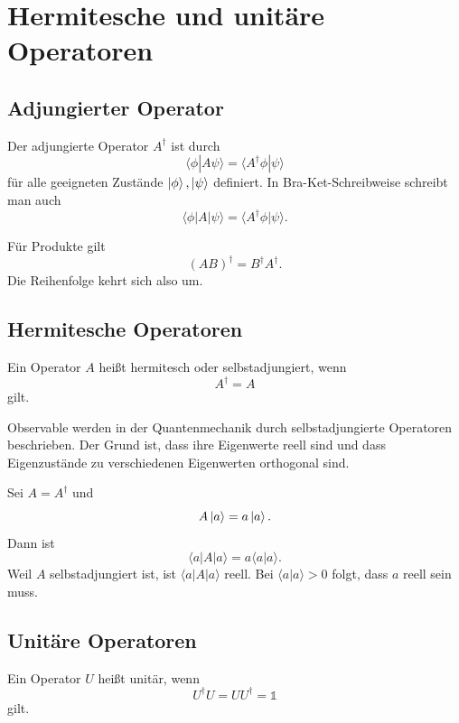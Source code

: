 \section{Hermitesche und unitäre Operatoren}

\subsection{Adjungierter Operator}

\begin{definitionbox}
Der adjungierte Operator $A^\dagger$ ist durch
\[
    \langle\phi|A\psi\rangle=\langle A^\dagger\phi|\psi\rangle
\]
für alle geeigneten Zustände $\left|\phi\right\rangle,\left|\psi\right\rangle$ definiert. In Bra-Ket-Schreibweise schreibt man auch
\[
    \langle\phi|A|\psi\rangle
    =\langle A^\dagger\phi|\psi\rangle.
\]
\end{definitionbox}

Für Produkte gilt
\[
    (AB)^\dagger=B^\dagger A^\dagger.
\]
Die Reihenfolge kehrt sich also um.

\subsection{Hermitesche Operatoren}

\begin{definitionbox}
Ein Operator $A$ heißt hermitesch oder selbstadjungiert, wenn
\[
    A^\dagger=A
\]
gilt.
\end{definitionbox}

Observable werden in der Quantenmechanik durch selbstadjungierte Operatoren beschrieben. Der Grund ist, dass ihre Eigenwerte reell sind und dass Eigenzustände zu verschiedenen Eigenwerten orthogonal sind.

\begin{derivationbox}
Sei $A=A^\dagger$ und
\[
    A\left|a\right\rangle=a\left|a\right\rangle.
\]
Dann ist
\[
    \langle a|A|a\rangle=a\langle a|a\rangle.
\]
Weil $A$ selbstadjungiert ist, ist $\langle a|A|a\rangle$ reell. Bei $\langle a|a\rangle>0$ folgt, dass $a$ reell sein muss.
\end{derivationbox}

\subsection{Unitäre Operatoren}

\begin{definitionbox}
Ein Operator $U$ heißt unitär, wenn
\[
    U^\dagger U=UU^\dagger=\mathbb 1
\]
gilt.
\end{definitionbox}

